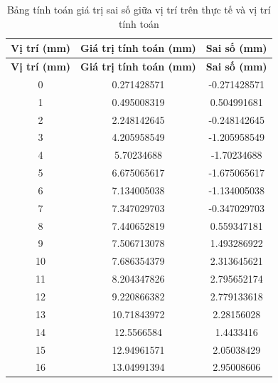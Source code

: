             \begin{longtable}{|c|c|c|}
                \caption{Bảng tính toán giá trị sai số giữa vị trí trên thực tế và vị trí tính toán}
                \label{tab:4-5} \\
                \hline
                \textbf{Vị trí (mm)} & \textbf{Giá trị tính toán (mm)} & \textbf{Sai số (mm)} \\
                \hline
                \endfirsthead
                
                \hline
                \textbf{Vị trí (mm)}  & \textbf{Giá trị tính toán (mm)} & \textbf{Sai số (mm)} \\
                \hline
                \endhead
                0 & 0.271428571 & -0.271428571 \\
                \hline
                1 & 0.495008319 & 0.504991681 \\
                \hline
                2 & 2.248142645 & -0.248142645 \\
                \hline
                3 & 4.205958549 & -1.205958549 \\
                \hline
                4 & 5.70234688 & -1.70234688 \\
                \hline
                5 & 6.675065617 & -1.675065617 \\
                \hline
                6 & 7.134005038 & -1.134005038 \\
                \hline
                7 & 7.347029703 & -0.347029703 \\
                \hline
                8 & 7.440652819 & 0.559347181 \\
                \hline
                9 & 7.506713078 & 1.493286922 \\
                \hline
                10 & 7.686354379 & 2.313645621 \\
                \hline
                11 & 8.204347826 & 2.795652174 \\
                \hline
                12 & 9.220866382 & 2.779133618 \\
                \hline
                13 & 10.71843972 & 2.28156028 \\
                \hline
                14 & 12.5566584 & 1.4433416 \\
                \hline
                15 & 12.94961571 & 2.05038429 \\
                \hline
                16 & 13.04991394 & 2.95008606 \\

\end{longtable}
